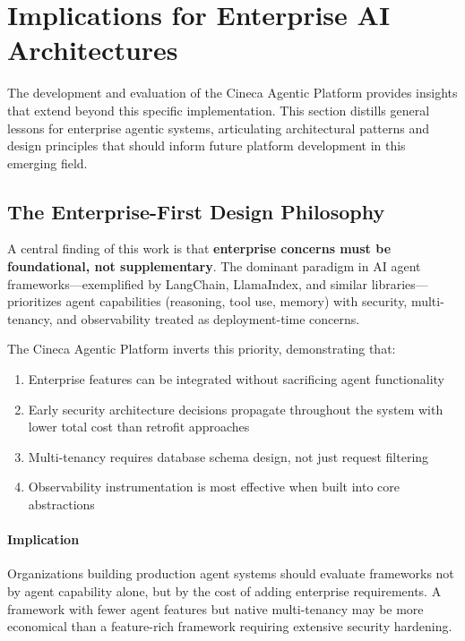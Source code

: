 
\section{Implications for Enterprise AI Architectures}
\label{sec:implications}

The development and evaluation of the Cineca Agentic Platform provides insights that extend beyond this specific implementation. This section distills general lessons for enterprise agentic systems, articulating architectural patterns and design principles that should inform future platform development in this emerging field.

\subsection{The Enterprise-First Design Philosophy}

A central finding of this work is that \textbf{enterprise concerns must be foundational, not supplementary}. The dominant paradigm in AI agent frameworks---exemplified by LangChain, LlamaIndex, and similar libraries---prioritizes agent capabilities (reasoning, tool use, memory) with security, multi-tenancy, and observability treated as deployment-time concerns.

The Cineca Agentic Platform inverts this priority, demonstrating that:

\begin{enumerate}
    \item Enterprise features can be integrated without sacrificing agent functionality
    \item Early security architecture decisions propagate throughout the system with lower total cost than retrofit approaches
    \item Multi-tenancy requires database schema design, not just request filtering
    \item Observability instrumentation is most effective when built into core abstractions
\end{enumerate}

\paragraph{Implication}
Organizations building production agent systems should evaluate frameworks not by agent capability alone, but by the cost of adding enterprise requirements. A framework with fewer agent features but native multi-tenancy may be more economical than a feature-rich framework requiring extensive security hardening.

